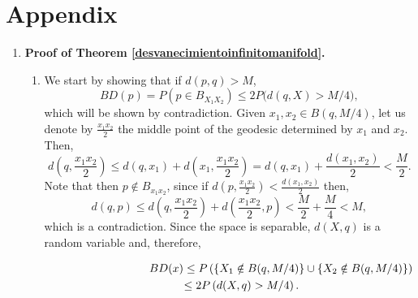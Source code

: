 \documentclass[a4paper]{article}
\numberwithin{equation}{section}
\begin{document}
\section*{Appendix}
\begin{enumerate}[label=(\Alph*)]

\item \textbf{Proof of Theorem \ref{desvanecimientoinfinitomanifold}.}
\begin{enumerate}[label=(\alph*)]
\item We start by showing that if  $d(p,q)>M$, 
\begin{equation}
\label{des1}
BD(p)=P\left( p \in B_{X_1 X_2} \right) \leq 2 P\big( d(q,X)>M/ 4 \big),
\end{equation}
which will be shown by contradiction. Given $x_1, x_2 \in  B(q, M/4)$, let us denote by $\frac{x_1x_2}{2}$  the middle point of the geodesic determined by  $x_1$ and $x_2$. Then,  
\begin{displaymath}
d(q,\frac{x_1x_2}{2}) \leq d(q,x_1) + d(x_1,\frac{x_1x_2}{2}) = d(q,x_1) + \frac{d(x_1,x_2)}{2} < \frac{M}{2}.
\end{displaymath}
Note that then $p \notin B_{x_1 x_2}$, since if  $d(p,\frac{x_1x_2}{2})<\frac{d(x_1,x_2)}{2}$ then,
\begin{displaymath}
d(q,p) \leq  d(q,\frac{x_1x_2}{2})+d(\frac{x_1x_2}{2},p)< \frac{M}{2} + \frac{M}{4}< M,
\end{displaymath}
which is a contradiction. Since the space is separable, $d(X,q)$ is a random variable and, therefore,

\begin{align*}
BD(x)\leq P \left( \left \{ X_1 \notin B(q,M/4) \right \}\cup \left \{ X_2 \notin B(q,M/4) \right \} \right) \\
& \hspace{-7.2 cm}\leq  2 P\left( d(X,q) > M/ 4 \right).
\end{align*}


\end{enumerate}
\end{enumerate}
\end{document}
